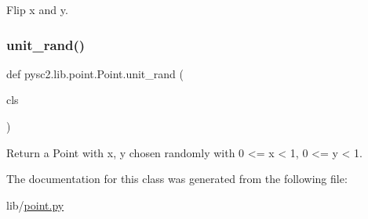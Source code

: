 \begin{DoxyVerb}Flip x and y.\end{DoxyVerb}
 \mbox{\label{classpysc2_1_1lib_1_1point_1_1_point_ad2cff4370eeb8f921f978ecb442be278}} 
\subsubsection{\texorpdfstring{unit\+\_\+rand()}{unit\_rand()}}
{\footnotesize\ttfamily def pysc2.\+lib.\+point.\+Point.\+unit\+\_\+rand (\begin{DoxyParamCaption}\item[{}]{cls }\end{DoxyParamCaption})}

\begin{DoxyVerb}Return a Point with x, y chosen randomly with 0 <= x < 1, 0 <= y < 1.\end{DoxyVerb}
 

The documentation for this class was generated from the following file\+:\begin{DoxyCompactItemize}
\item 
lib/\mbox{\hyperlink{point_8py}{point.\+py}}\end{DoxyCompactItemize}
